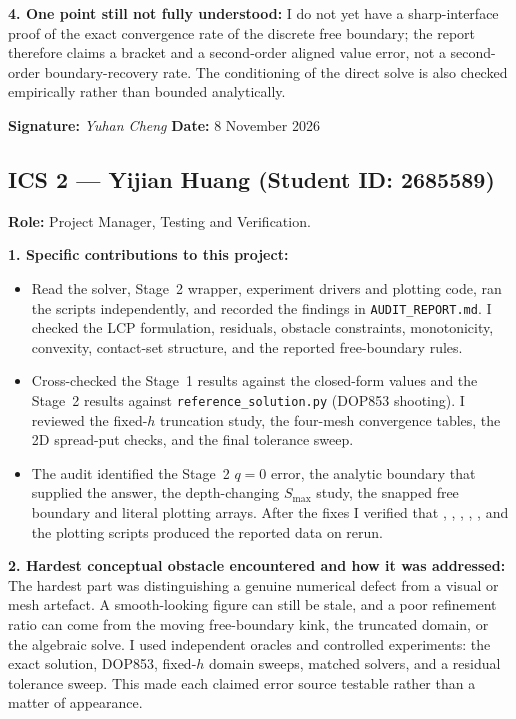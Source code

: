 \documentclass[11pt,a4paper]{article}
\theoremstyle{definition}
\theoremstyle{remark}
\begin{document}
\begin{formbox}
\textbf{4. One point still not fully understood:}
I do not yet have a sharp-interface proof of the exact convergence rate of the
discrete free boundary; the report therefore claims a bracket and a
second-order aligned value error, not a second-order boundary-recovery rate.
The conditioning of the direct solve is also checked empirically rather than
bounded analytically.

\textbf{Signature:} \textit{Yuhan Cheng} \quad
\textbf{Date:} 8 November 2026
\end{formbox}

\newpage
\subsection*{ICS 2 --- Yijian Huang (Student ID: 2685589)}
\begin{formbox}
\small
\textbf{Role:} Project Manager, Testing and Verification.

\textbf{1. Specific contributions to this project:}
\begin{itemize}[leftmargin=1.4em, itemsep=1pt]
\item Read the solver, Stage~2 wrapper, experiment drivers and plotting code,
ran the scripts independently, and recorded the findings in
\texttt{AUDIT\_REPORT.md}. I checked the LCP formulation, residuals, obstacle
constraints, monotonicity, convexity, contact-set structure, and the reported
free-boundary rules.
\item Cross-checked the Stage~1 results against the closed-form values and the
Stage~2 results against \texttt{reference\_solution.py} (DOP853 shooting). I
reviewed the fixed-$h$ truncation study, the four-mesh convergence tables, the
2D spread-put checks, and the final tolerance sweep.
\item The audit identified the Stage~2 $q=0$ error, the analytic boundary that
supplied the answer, the depth-changing $S_{\max}$ study, the snapped free
boundary and literal plotting arrays. After the fixes I verified that
, ,
, ,
, and the plotting scripts produced the
reported data on rerun.
\end{itemize}

\textbf{2. Hardest conceptual obstacle encountered and how it was addressed:}
The hardest part was distinguishing a genuine numerical defect from a visual
or mesh artefact. A smooth-looking figure can still be stale, and a poor
refinement ratio can come from the moving free-boundary kink, the truncated
domain, or the algebraic solve. I used independent oracles and controlled
experiments: the exact solution, DOP853, fixed-$h$ domain sweeps, matched
solvers, and a residual tolerance sweep. This made each claimed error source
testable rather than a matter of appearance.


\end{formbox}
\end{document}
